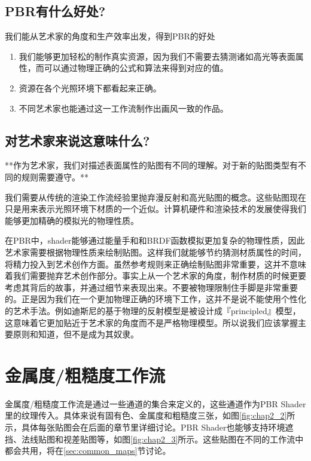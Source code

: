 \subsection{PBR有什么好处?}

我们能从艺术家的角度和生产效率出发，得到PBR的好处

\begin{enumerate}
\item 我们能够更加轻松的制作真实资源，因为我们不需要去猜测诸如高光等表面属性，而可以通过物理正确的公式和算法来得到对应的值。
\item 资源在各个光照环境下都看起来正确。
\item 不同艺术家也能通过这一工作流制作出画风一致的作品。
\end{enumerate}

\subsection{对艺术家来说这意味什么?}

**作为艺术家，我们对描述表面属性的贴图有不同的理解。对于新的贴图类型有不同的规则需要遵守。**

我们需要从传统的渲染工作流经验里抛弃漫反射和高光贴图的概念。这些贴图现在只是用来表示光照环境下材质的一个近似。计算机硬件和渲染技术的发展使得我们能够更加精确的模拟光的物理性质。

在PBR中，shader能够通过能量手和和BRDF函数模拟更加复杂的物理性质，因此艺术家需要根据物理性质来绘制贴图。这样我们就能够节约猜测材质属性的时间，将精力投入到艺术创作方面。虽然参考规则来正确绘制贴图非常重要，这并不意味着我们需要抛弃艺术创作部分。事实上从一个艺术家的角度，制作材质的时候更要考虑其背后的故事，并通过细节来表现出来。不要被物理限制住手脚是非常重要的。正是因为我们在一个更加物理正确的环境下工作，这并不是说不能使用个性化的艺术手法。例如迪斯尼的基于物理的反射模型是被设计成『principled』模型，这意味着它更加贴近于艺术家的角度而不是严格物理模型。所以说我们应该掌握主要原则和知道，但不是成为其奴隶。

\section{金属度/粗糙度工作流}

金属度/粗糙度工作流是通过一些通道的集合来定义的，这些通道作为PBR Shader里的纹理传入。具体来说有固有色、金属度和粗糙度三张，如图\ref{fig:chap2_2}所示，具体每张贴图会在后面的章节里详细讨论。PBR Shader也能够支持环境遮挡、法线贴图和视差贴图等，如图\ref{fig:chap2_3}所示。这些贴图在不同的工作流中都会共用，将在\ref{sec:common_maps}节讨论。


